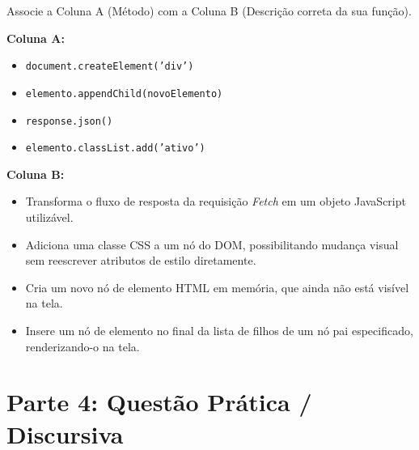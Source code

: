 \documentclass[12pt,a4paper]{article}
\newcommand{\correto}[1]{\iftoggle{gabarito}{\textbf{\color{corGabarito}#1}}{#1}}
\begin{document}
\begin{tcolorbox}[colback=white, colframe=azulTitulo, title=Questão 9: Métodos DOM e API]
    Associe a Coluna A (Método) com a Coluna B (Descrição correta da sua função).

    \vspace{0.3cm}
    \textbf{Coluna A:}
    \begin{itemize}
        \item[(1)] \texttt{document.createElement('div')}
        \item[(2)] \texttt{elemento.appendChild(novoElemento)}
        \item[(3)] \texttt{response.json()}
        \item[(4)] \texttt{elemento.classList.add('ativo')}
    \end{itemize}

    \textbf{Coluna B:}
    \begin{itemize}
        \item[ ( \correto{3} ) ] Transforma o fluxo de resposta da requisição \textit{Fetch} em um objeto JavaScript utilizável.
        \item[ ( \correto{4} ) ] Adiciona uma classe CSS a um nó do DOM, possibilitando mudança visual sem reescrever atributos de estilo diretamente.
        \item[ ( \correto{1} ) ] Cria um novo nó de elemento HTML em memória, que ainda não está visível na tela.
        \item[ ( \correto{2} ) ] Insere um nó de elemento no final da lista de filhos de um nó pai especificado, renderizando-o na tela.
    \end{itemize}
\end{tcolorbox}

\newpage
\section*{Parte 4: Questão Prática / Discursiva}
\end{document}
